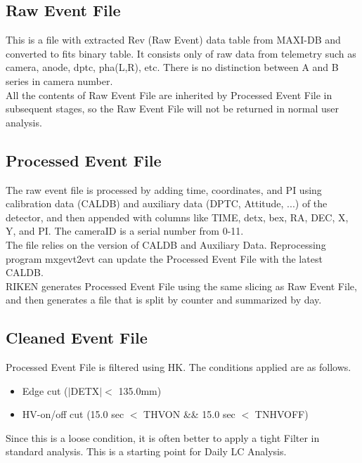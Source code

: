 \documentclass[10pt]{report}
\renewcommand{\_}{\textscale{.5}{\textbf{\textunderscore}}}
\begin{document}
\subsection{Raw Event File}\label{subsec:2.1.2}

This is a file with extracted Rev (Raw Event) data table from MAXI-DB and converted to fits binary table. It consists only of raw data from telemetry such as camera, anode, dptc, pha(L,R), etc. There is no distinction between A and B series in camera number. \\
\indent All the contents of Raw Event File are inherited by Processed Event File in subsequent stages, so the Raw Event File will not be returned in normal user analysis. \\

\subsection{Processed Event File}\label{subsec:2.1.3}

The raw event file is processed by adding time, coordinates, and PI using calibration data (CALDB) and auxiliary data (DPTC, Attitude, ...) of the detector, and then appended with columns like TIME, detx, bex, RA, DEC, X, Y, and PI. The cameraID is a serial number from 0-11. \\
\indent The file relies on the version of CALDB and Auxiliary Data. Reprocessing program mxgevt2evt can update the Processed Event File with the latest CALDB. \\
\indent RIKEN generates Processed Event File using the same slicing as Raw Event File, and then generates a file that is split by counter and summarized by day. \\

\subsection{Cleaned Event File}\label{subsec:2.1.4}

Processed Event File is filtered using HK. The conditions applied are as follows.
\begin{itemize}
  \item Edge cut ($|$DETX$|<$ 135.0mm)
  \item HV-on/off cut (15.0 sec $<$ T\_HV\_ON \&\& 15.0 sec $<$ TN\_HV\_OFF)
\end{itemize}
Since this is a loose condition, it is often better to apply a tight Filter in standard analysis. This is a starting point for Daily LC Analysis. \\
\end{document}

